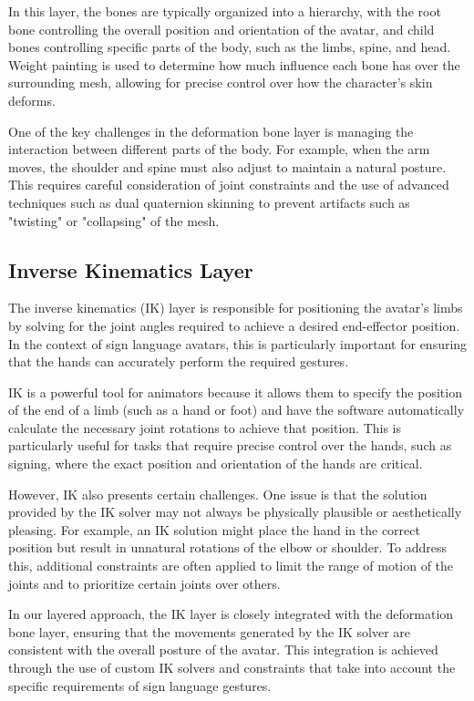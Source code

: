 \documentclass[../../main.tex]{subfiles}
\begin{document}
In this layer, the bones are typically organized into a hierarchy, with the root bone controlling the overall position and orientation of the avatar, and child bones controlling specific parts of the body, such as the limbs, spine, and head. Weight painting is used to determine how much influence each bone has over the surrounding mesh, allowing for precise control over how the character's skin deforms.

One of the key challenges in the deformation bone layer is managing the interaction between different parts of the body. For example, when the arm moves, the shoulder and spine must also adjust to maintain a natural posture. This requires careful consideration of joint constraints and the use of advanced techniques such as dual quaternion skinning to prevent artifacts such as "twisting" or "collapsing" of the mesh.

\subsection{Inverse Kinematics Layer}
The inverse kinematics (IK) layer is responsible for positioning the avatar's limbs by solving for the joint angles required to achieve a desired end-effector position. In the context of sign language avatars, this is particularly important for ensuring that the hands can accurately perform the required gestures.

IK is a powerful tool for animators because it allows them to specify the position of the end of a limb (such as a hand or foot) and have the software automatically calculate the necessary joint rotations to achieve that position. This is particularly useful for tasks that require precise control over the hands, such as signing, where the exact position and orientation of the hands are critical.

However, IK also presents certain challenges. One issue is that the solution provided by the IK solver may not always be physically plausible or aesthetically pleasing. For example, an IK solution might place the hand in the correct position but result in unnatural rotations of the elbow or shoulder. To address this, additional constraints are often applied to limit the range of motion of the joints and to prioritize certain joints over others.

In our layered approach, the IK layer is closely integrated with the deformation bone layer, ensuring that the movements generated by the IK solver are consistent with the overall posture of the avatar. This integration is achieved through the use of custom IK solvers and constraints that take into account the specific requirements of sign language gestures.
\end{document}
